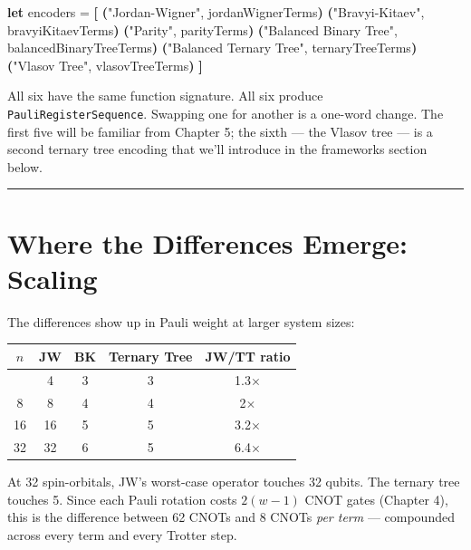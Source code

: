 \documentclass[
  11pt,
  oneside]{book}
\newenvironment{Shaded}{\begin{snugshade}}{\end{snugshade}}
\newcommand{\KeywordTok}[1]{\textcolor[rgb]{0.13,0.29,0.53}{\textbf{#1}}}
\newcommand{\NormalTok}[1]{#1}
\newcommand{\OperatorTok}[1]{\textcolor[rgb]{0.81,0.36,0.00}{\textbf{#1}}}
\newcommand{\StringTok}[1]{\textcolor[rgb]{0.31,0.60,0.02}{#1}}
\begin{document}
\begin{Shaded}
\begin{Highlighting}[]
\KeywordTok{let}\NormalTok{ encoders = }\OperatorTok{[}
    \OperatorTok{(}\StringTok{"Jordan{-}Wigner"}\NormalTok{,         jordanWignerTerms}\OperatorTok{)}
    \OperatorTok{(}\StringTok{"Bravyi{-}Kitaev"}\NormalTok{,         bravyiKitaevTerms}\OperatorTok{)}
    \OperatorTok{(}\StringTok{"Parity"}\NormalTok{,                parityTerms}\OperatorTok{)}
    \OperatorTok{(}\StringTok{"Balanced Binary Tree"}\NormalTok{,  balancedBinaryTreeTerms}\OperatorTok{)}
    \OperatorTok{(}\StringTok{"Balanced Ternary Tree"}\NormalTok{, ternaryTreeTerms}\OperatorTok{)}
    \OperatorTok{(}\StringTok{"Vlasov Tree"}\NormalTok{,           vlasovTreeTerms}\OperatorTok{)}
\OperatorTok{]}
\end{Highlighting}
\end{Shaded}

All six have the same function signature. All six produce
\texttt{PauliRegisterSequence}. Swapping one for another is a one-word
change. The first five will be familiar from Chapter 5; the sixth ---
the Vlasov tree --- is a second ternary tree encoding that we'll
introduce in the frameworks section below.

\begin{center}\rule{0.5\linewidth}{0.5pt}\end{center}

\section{Where the Differences Emerge:
Scaling}\label{where-the-differences-emerge-scaling}

The differences show up in Pauli weight at larger system sizes:

\begin{longtable}[]{@{}ccccc@{}}
\toprule\noalign{}
\(n\) & JW & BK & Ternary Tree & JW/TT ratio \\
\midrule\noalign{}
\endhead
\bottomrule\noalign{}
\endlastfoot
4 & 4 & 3 & 3 & 1.3$\times$ \\
8 & 8 & 4 & 4 & 2$\times$ \\
16 & 16 & 5 & 5 & 3.2$\times$ \\
32 & 32 & 6 & 5 & 6.4$\times$ \\
\end{longtable}

At 32 spin-orbitals, JW's worst-case operator touches 32 qubits. The
ternary tree touches 5. Since each Pauli rotation costs \(2(w-1)\) CNOT
gates (Chapter 4), this is the difference between 62 CNOTs and 8 CNOTs
\emph{per term} --- compounded across every term and every Trotter step.
\end{document}
